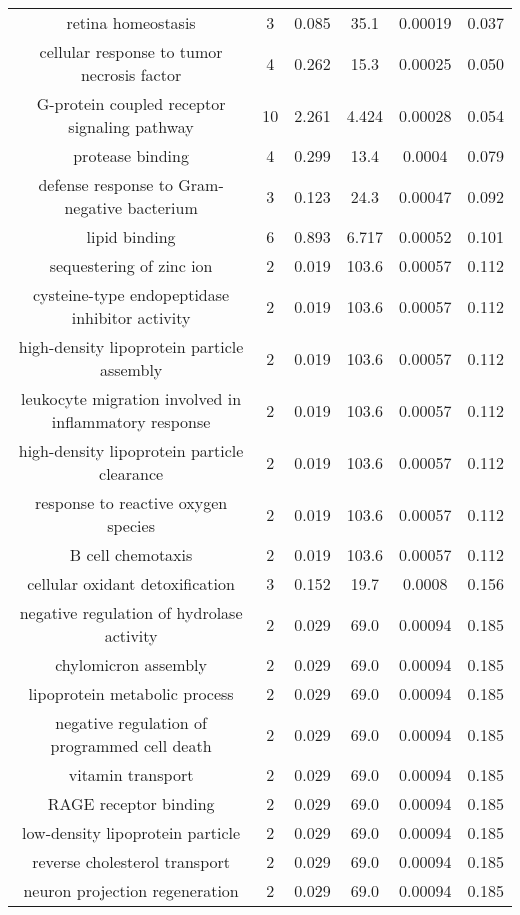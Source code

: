 \documentclass[USLetter,5pt]{article}
\begin{document}
\begin{table}[ht]
\begin{adjustbox}{width = 1\textwidth}
\begin{tabular}{|c|c|c|c|c|c|}
retina homeostasis & 3 &  0.085 &   35.1 & 0.00019 &  0.037\\
cellular response to tumor necrosis factor & 4 &  0.262 &   15.3 & 0.00025 &  0.050\\
G-protein coupled receptor signaling pathway & 10 &  2.261 &  4.424 & 0.00028 &  0.054\\
protease binding & 4 &  0.299 &   13.4 & 0.0004 &  0.079\\
defense response to Gram-negative bacterium & 3 &  0.123 &   24.3 & 0.00047 &  0.092\\
lipid binding & 6 &  0.893 &  6.717 & 0.00052 &  0.101\\
sequestering of zinc ion & 2 &  0.019 &  103.6 & 0.00057 &  0.112\\
cysteine-type endopeptidase inhibitor activity & 2 &  0.019 &  103.6 & 0.00057 &  0.112\\
high-density lipoprotein particle assembly & 2 &  0.019 &  103.6 & 0.00057 &  0.112\\
leukocyte migration involved in inflammatory response & 2 &  0.019 &  103.6 & 0.00057 &  0.112\\
high-density lipoprotein particle clearance & 2 &  0.019 &  103.6 & 0.00057 &  0.112\\
response to reactive oxygen species & 2 &  0.019 &  103.6 & 0.00057 &  0.112\\
B cell chemotaxis & 2 &  0.019 &  103.6 & 0.00057 &  0.112\\
cellular oxidant detoxification & 3 &  0.152 &   19.7 & 0.0008 &  0.156\\
negative regulation of hydrolase activity & 2 &  0.029 &   69.0 & 0.00094 &  0.185\\
chylomicron assembly & 2 &  0.029 &   69.0 & 0.00094 &  0.185\\
lipoprotein metabolic process & 2 &  0.029 &   69.0 & 0.00094 &  0.185\\
negative regulation of programmed cell death & 2 &  0.029 &   69.0 & 0.00094 &  0.185\\
vitamin transport & 2 &  0.029 &   69.0 & 0.00094 &  0.185\\
RAGE receptor binding & 2 &  0.029 &   69.0 & 0.00094 &  0.185\\
low-density lipoprotein particle & 2 &  0.029 &   69.0 & 0.00094 &  0.185\\
reverse cholesterol transport & 2 &  0.029 &   69.0 & 0.00094 &  0.185\\
neuron projection regeneration & 2 &  0.029 &   69.0 & 0.00094 &  0.185\\

\end{tabular}
\end{adjustbox}
\end{table}
\end{document}
